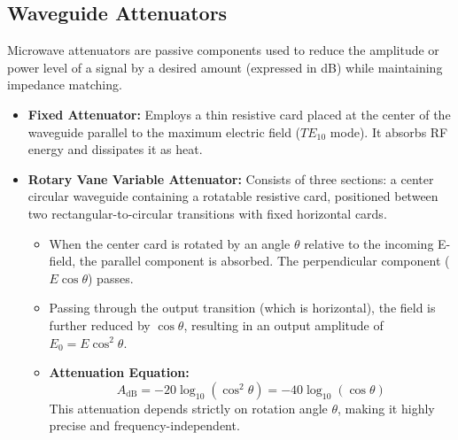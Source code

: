\documentclass[12pt,a4paper]{article}
\begin{document}
\subsection{Waveguide Attenuators}
Microwave attenuators are passive components used to reduce the amplitude or power level of a signal by a desired amount (expressed in dB) while maintaining impedance matching.
\begin{itemize}[leftmargin=*, itemsep=3pt]
  \item \textbf{Fixed Attenuator:} Employs a thin resistive card placed at the center of the waveguide parallel to the maximum electric field ($TE_{10}$ mode). It absorbs RF energy and dissipates it as heat.
  \item \textbf{Rotary Vane Variable Attenuator:} Consists of three sections: a center circular waveguide containing a rotatable resistive card, positioned between two rectangular-to-circular transitions with fixed horizontal cards.
  \begin{itemize}[leftmargin=*, itemsep=2.5pt, topsep=0pt]
    \item When the center card is rotated by an angle $\theta$ relative to the incoming E-field, the parallel component is absorbed. The perpendicular component ($E \cos\theta$) passes.
    \item Passing through the output transition (which is horizontal), the field is further reduced by $\cos\theta$, resulting in an output amplitude of $E_0 = E \cos^2\theta$.
    \item \textbf{Attenuation Equation:}
      \begin{equation}
        A_{\text{dB}} = -20 \log_{10}(\cos^2\theta) = -40 \log_{10}(\cos\theta)
      \end{equation}
      This attenuation depends strictly on rotation angle $\theta$, making it highly precise and frequency-independent.
  \end{itemize}
\end{itemize}
\end{document}
